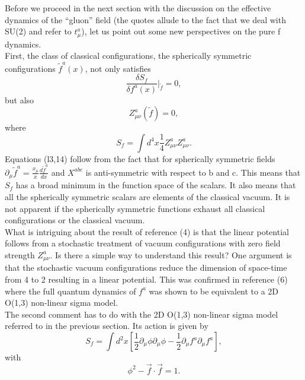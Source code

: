 \documentclass[a4paper,12pt]{article}
\begin{document}
Before we proceed in the next section with the discussion on the effective dynamics of the ``gluon'' field (the quotes allude to the fact that we deal with SU(2) and refer to $t^{a}_{\mu}$), let us point out some new perspectives on the pure f dynamics.\\

First, the class of classical configurations, the spherically symmetric configurations $\tilde{f}^{a}(x)$, not only satisfies
\begin{equation}\label{7}
\frac{\delta S_{f}}{\delta f^{a}(x)}\vert_{\tilde{f}}=0,
\end{equation}
but also
\begin{equation}\label{8}
Z^{a}_{\mu\nu}(\tilde{f}) = 0,
\end{equation}
where
\begin{equation}\label{9}
S_{f} = \int d^{4}x\frac{1}{4}Z^{a}_{\mu\nu} Z^{a}_{\mu\nu}.
\end{equation}
Equations (l3,14) follow from the fact that for spherically symmetric fields $\partial_{\mu}\tilde{f}^{a} = \frac{x_{\mu}}{x}\frac{d\tilde{f}^{a}}{dx}$ and $X^{abc}$ is anti-symmetric with respect to b and c.  This means that $S_{f}$ has a broad minimum in the function space of the scalars.  It also means that all the spherically symmetric scalars are elements of the classical vacuum.  It is not apparent if the spherically symmetric functions exhaust all classical configurations or the classical vacuum.\\

What is intriguing about the result of reference (4) is that the linear potential follows from a stochastic treatment of vacuum configurations with zero field strength $Z^{a}_{\mu\nu}$.  Is there a simple way to understand this result?  One argument is that the stochastic vacuum configurations  reduce the dimension of space-time from 4 to 2 resulting in a linear potential.  This was confirmed in reference (6) where the full quantum dynamics of $f^{a}$ was shown to be equivalent to a 2D O(1,3) non-linear sigma model.\\

The second comment has to do with the 2D O(1,3) non-linear sigma model referred to in the previous section.  Its action is given by
\begin{equation}\label{10}
S_{f} = \int d^{2}x [\frac{1}{2}\partial_{\mu}\phi\partial_{\mu}\phi-\frac{1}{2}\partial_{\mu}f^{a}\partial_{\mu}f^{a}],
\end{equation}
with
\begin{equation}\label{11}
\phi^{2} - \vec{f}\cdot\vec{f} = 1.
\end{equation}
\end{document}
